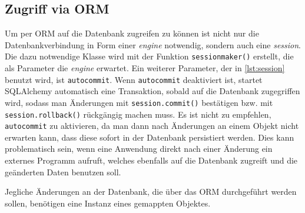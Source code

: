 

\subsection{Zugriff via ORM}\label{sqlalchemy-orm}

Um per ORM auf die Datenbank zugreifen zu können ist nicht nur die
Datenbankverbindung in Form einer \emph{engine} notwendig, sondern auch eine
\emph{session}. Die dazu notwendige Klasse wird mit der Funktion
\texttt{sessionmaker()} erstellt, die als Parameter die \emph{engine} erwartet.
Ein weiterer Parameter, der in \autoref{lst:session} benutzt wird, ist
\texttt{autocommit}. Wenn \texttt{autocommit} deaktiviert ist, startet
SQLAlchemy automatisch eine Transaktion, sobald auf die Datenbank zugegriffen
wird, sodass man Änderungen mit \texttt{session.commit()} bestätigen bzw. mit
\texttt{session.rollback()} rückgängig machen muss. Es ist nicht zu empfehlen,
\texttt{autocommit} zu aktivieren, da man dann nach Änderungen an einem Objekt
nicht erwarten kann, dass diese sofort in der Datenbank persistiert werden.
Dies kann problematisch sein, wenn eine Anwendung direkt nach einer Änderung
ein externes Programm aufruft, welches ebenfalls auf die Datenbank zugreift
und die geänderten Daten benutzen soll.



Jegliche Änderungen an der Datenbank, die über das ORM durchgeführt werden
sollen, benötigen eine Instanz eines gemappten Objektes.

